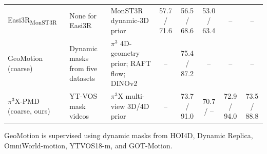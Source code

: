 \begin{table}[t]
\begin{tabularx}{\textwidth}{@{}
>{\raggedright\arraybackslash}p{2.12cm}
>{\raggedright\arraybackslash}p{2.25cm}
>{\raggedright\arraybackslash}X
*{5}{c}
@{}}
Easi3R\textsubscript{MonST3R}~\citep{easi3r}
& None for Easi3R
& MonST3R dynamic-3D prior
& 57.7 / 71.6
& 56.5 / 68.6
& 53.0 / 63.4
& --
& -- \\

GeoMotion (coarse)~\citep{geomotion}
& Dynamic masks from five datasets
& $\pi^3$ 4D-geometry prior; RAFT flow; DINOv2
& --
& 75.4 / 87.2
& --
& --
& -- \\

\rowcolor{gray!10}
$\pi^3$X-PMD (coarse, ours)
& 160 YT-VOS mask videos
& $\pi^3$X multi-view 3D/4D prior
& --
& 73.7 / 91.0
& 70.7 / --
& 72.9 / 94.0
& 73.5 / 88.8 \\

\bottomrule
\end{tabularx}
\vspace{2pt}
\parbox{\textwidth}{\scriptsize GeoMotion is supervised using dynamic masks from HOI4D, Dynamic Replica, OmniWorld-motion, YTVOS18-m, and GOT-Motion.}
\end{table}


